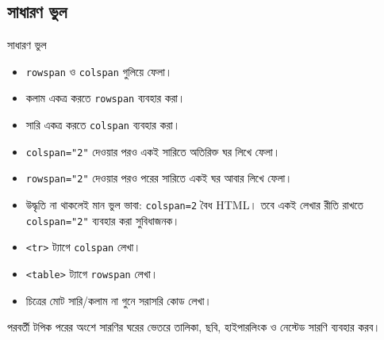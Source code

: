 \subsection{সাধারণ ভুল}

\begin{mistakebox}{সাধারণ ভুল}
\par\noindent
\begin{minipage}[t]{.48\linewidth}\vspace{0pt}
\begin{itemize}
\item \texttt{rowspan} ও \texttt{colspan} গুলিয়ে ফেলা।
\item কলাম একত্র করতে \texttt{rowspan} ব্যবহার করা।
\item সারি একত্র করতে \texttt{colspan} ব্যবহার করা।
\item \texttt{colspan="2"} দেওয়ার পরও একই সারিতে অতিরিক্ত ঘর লিখে ফেলা।
\item \texttt{rowspan="2"} দেওয়ার পরও পরের সারিতে একই ঘর আবার লিখে ফেলা।
\end{itemize}
\end{minipage}\hfill
\begin{minipage}[t]{.48\linewidth}\vspace{0pt}
\begin{itemize}
\item উদ্ধৃতি না থাকলেই মান ভুল ভাবা: \texttt{colspan=2} বৈধ HTML। তবে একই লেখার রীতি রাখতে \texttt{colspan="2"} ব্যবহার করা সুবিধাজনক।
\item \texttt{<tr>} ট্যাগে \texttt{colspan} লেখা।
\item \texttt{<table>} ট্যাগে \texttt{rowspan} লেখা।
\item চিত্রের মোট সারি/কলাম না গুনে সরাসরি কোড লেখা।
\end{itemize}
\end{minipage}\par

\end{mistakebox}

\begin{boardbox}{পরবর্তী টপিক}
পরের অংশে সারণির ঘরের ভেতরে তালিকা, ছবি, হাইপারলিংক ও নেস্টেড সারণি ব্যবহার করব।
\end{boardbox}
